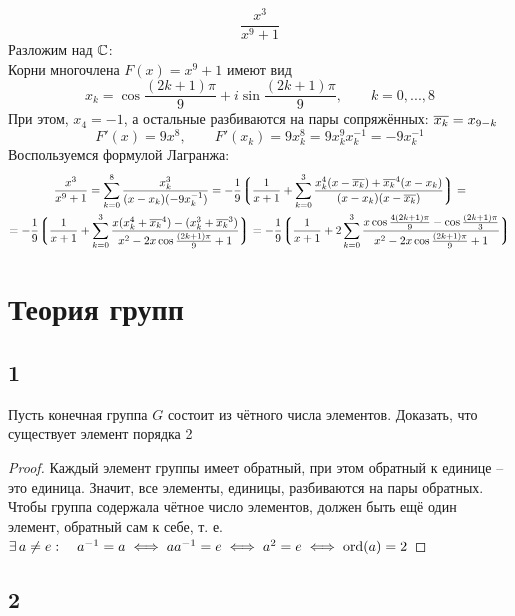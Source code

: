 $$ \frac{x^3}{x^9 + 1} $$
Разложим над $ \mathbb{C} $: \\
Корни многочлена $ F(x) = x^9 + 1 $ имеют вид
$$ x_k = \cos\frac{(2k + 1)\pi}9 + i\sin\frac{(2k + 1)\pi}9, \qquad k = 0, ..., 8 $$
При этом, $ x_4 = -1 $, а остальные разбиваются на пары сопряжённых: $ \overline{x_k} = x_{9 - k} $
$$ F'(x) = 9x^8, \qquad F'(x_k) = 9x_k^8 = 9x_k^9x_k^{-1} = -9x_k^{-1} $$
Воспользуемся формулой Лагранжа:
\begin{multline*}
    \frac{x^3}{x^9 + 1} = \sum_{k = 0}^8\frac{x_k^3}{(x - x_k)(-9x_k^{-1})} = -\frac19 \bigg\lgroup \frac1{x + 1} + \sum_{k = 0}^3 \frac{x_k^4(x - \overline{x_k}) + \overline{x_k}^4(x - x_k)}{(x - x_k)(x - \overline{x_k})} \bigg\rgroup = \\
    = -\frac19 \bigg\lgroup \frac1{x + 1} + \sum_{k = 0}^3 \frac{x(x_k^4 + \overline{x_k}^4) - (x_k^3 + \overline{x_k}^3)}{x^2 - 2x\cos\frac{(2k + 1)\pi}9 + 1} \bigg\rgroup = -\frac19 \bigg\lgroup \frac1{x + 1} + 2\sum_{k = 0}^3 \frac{x\cos\frac{4(2k + 1)\pi}9 - \cos\frac{(2k + 1)\pi}3}{x^2 - 2x\cos\frac{(2k + 1)\pi}9 + 1} \bigg\rgroup
\end{multline*}

\section{Теория групп}

\subsection{1}

\begin{statement}
	Пусть конечная группа $ G $ состоит из чётного числа элементов. Доказать, что существует элемент порядка 2
\end{statement}

\begin{proof}
	Каждый элемент группы имеет обратный, при этом обратный к единице -- это единица. Значит, все элементы, единицы, разбиваются на пары обратных. \\
    Чтобы группа содержала чётное число элементов, должен быть ещё один элемент, обратный сам к себе, т. е. $ \exists\, a \ne e : \quad a^{-1} = a \iff aa^{-1} = e \iff a^2 = e \iff \operatorname{ord}(a) = 2 $
\end{proof}

\subsection{2}

